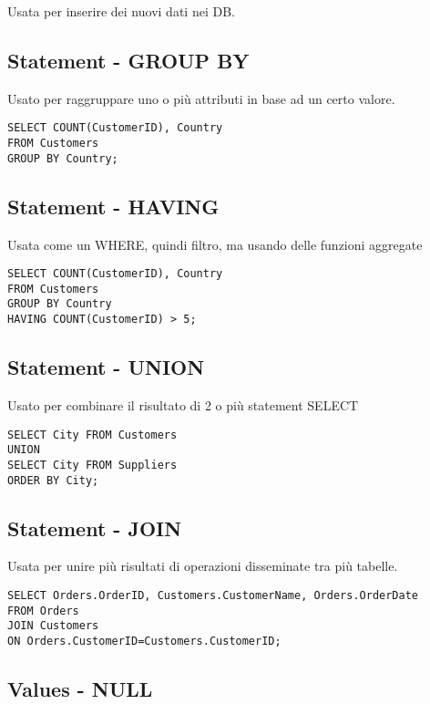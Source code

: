 Usata per inserire dei nuovi dati nei DB. 


\subsection{Statement - GROUP BY}

Usato per raggruppare uno o più attributi in base ad un certo valore.

\begin{lstlisting}
SELECT COUNT(CustomerID), Country
FROM Customers
GROUP BY Country;
\end{lstlisting}


\subsection{Statement - HAVING}

Usata come un WHERE, quindi filtro, ma usando delle funzioni aggregate

\begin{lstlisting}
SELECT COUNT(CustomerID), Country
FROM Customers
GROUP BY Country
HAVING COUNT(CustomerID) > 5;
\end{lstlisting}


\subsection{Statement - UNION}

Usato per combinare il risultato di 2 o più statement SELECT

\begin{lstlisting}
SELECT City FROM Customers
UNION
SELECT City FROM Suppliers
ORDER BY City;
\end{lstlisting}


\subsection{Statement - JOIN}

Usata per unire più risultati di operazioni disseminate tra più tabelle.

\begin{lstlisting}
SELECT Orders.OrderID, Customers.CustomerName, Orders.OrderDate
FROM Orders
JOIN Customers
ON Orders.CustomerID=Customers.CustomerID;
\end{lstlisting}


\subsection{Values - NULL}

